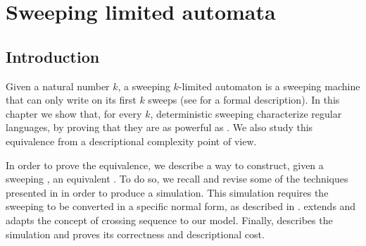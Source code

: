 \chapter{Sweeping limited automata}



\section{Introduction}
Given a natural number $k$, a sweeping $k$-limited automaton is a sweeping machine that can only write on its first $k$ sweeps (see  for a formal description).
In this chapter we show that, for every $k$, deterministic sweeping \kLAs characterize regular languages, by proving that they are as powerful as \NFAs. We also study this equivalence from a descriptional complexity point of view.

In order to prove the equivalence, we describe a way to construct, given a sweeping \kDLA, an equivalent \NFA.
To do so, we recall and revise some of the techniques presented in  in order to produce a simulation.
This simulation requires the sweeping \kDLA to be converted in a specific normal form, as described in .
 extends and adapts the concept of crossing sequence to our model.
Finally,  describes the simulation and proves its correctness and descriptional cost.



